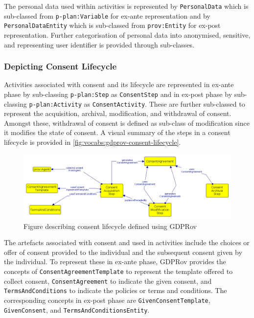 The personal data used within activities is represented by \texttt{PersonalData} which is sub-classed from \texttt{p-plan:Variable} for ex-ante representation and by \texttt{PersonalDataEntity} which is sub-classed from \texttt{prov:Entity} for ex-post representation.
Further categorisation of personal data into anonymised, sensitive, and representing user identifier is provided through sub-classes.

\subsubsection{Depicting Consent Lifecycle}
Activities associated with consent and its lifecycle are represented in ex-ante phase by sub-classing \texttt{p-plan:Step} as \texttt{ConsentStep} and in ex-post phase by sub-classing \texttt{p-plan:Activity} as \texttt{ConsentActivity}.
These are further sub-classed to represent the acquisition, archival, modification, and withdrawal of consent.
Amongst these, withdrawal of consent is defined as sub-class of modification since it modifies the state of consent.
A visual summary of the steps in a consent lifecycle is provided in \autoref{fig:vocabs:gdprov-consent-lifecycle}.
\begin{figure}[htbp]
    \centering
    \includegraphics[width=\linewidth]{img/GDPRov_consent_lifecycle.png}
    \caption{Figure describing consent lifecycle defined using GDPRov}
    \label{fig:vocabs:gdprov-consent-lifecycle}
\end{figure}

The artefacts associated with consent and used in activities include the choices or offer of consent provided to the individual and the subsequent consent given by the individual.
To represent these in ex-ante phase, GDPRov provides the concepts of \texttt{ConsentAgreementTemplate} to represent the template offered to collect consent, \texttt{ConsentAgreement} to indicate the given consent, and \texttt{TermsAndConditions} to indicate the policies or terms and conditions.
The corresponding concepts in ex-post phase are \texttt{GivenConsentTemplate}, \texttt{GivenConsent}, and \texttt{TermsAndConditionsEntity}.

